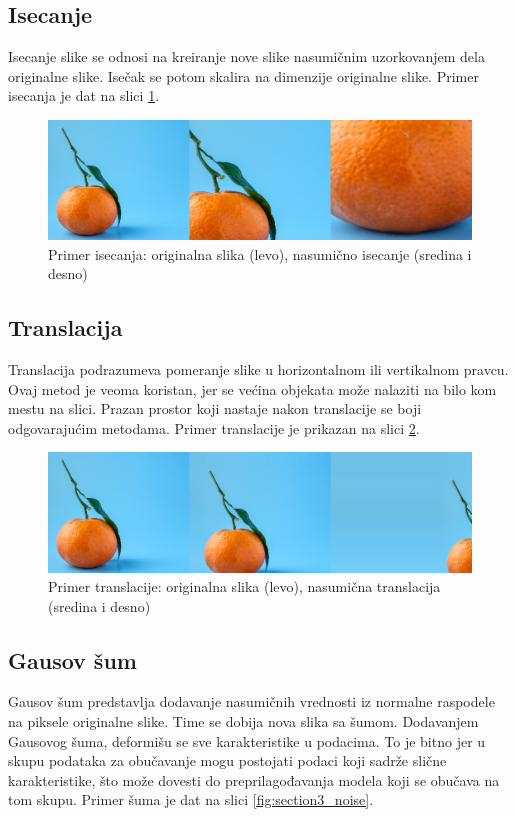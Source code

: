 \documentclass[12pt,oneside]{memoir}
\begin{document}
\subsection{Isecanje}
Isecanje slike se odnosi na kreiranje nove slike nasumičnim uzorkovanjem dela originalne slike. Isečak se potom skalira na dimenzije originalne slike. Primer isecanja je dat na slici \ref{fig:section3_cut}.
 
\begin{figure}[ht]
    \centering
    \includegraphics[width=1\textwidth]{matfmaster/glava3/crop.jpg}
    \caption{Primer isecanja: originalna slika (levo), nasumično isecanje (sredina i desno) \cite{unsplashOrange}}
    \label{fig:section3_cut}
\end{figure}

\subsection{Translacija}
Translacija podrazumeva pomeranje slike u horizontalnom ili vertikalnom pravcu. Ovaj metod je veoma koristan, jer se većina objekata može nalaziti na bilo kom mestu na slici. Prazan prostor koji nastaje nakon translacije se boji odgovarajućim metodama. Primer translacije je prikazan na slici \ref{fig:section3_trans}.

\begin{figure}[ht]
    \centering
    \includegraphics[width=1\textwidth]{matfmaster/glava3/translate.jpg}
    \caption{Primer translacije: originalna slika (levo), nasumična translacija (sredina i desno) \cite{unsplashOrange}}
    \label{fig:section3_trans}
\end{figure}

\subsection{Gausov šum}
Gausov šum predstavlja dodavanje nasumičnih vrednosti iz normalne raspodele na piksele originalne slike. Time se dobija nova slika sa šumom. Dodavanjem Gausovog šuma, deformišu se sve karakteristike u podacima. To je bitno jer u skupu podataka za obučavanje mogu postojati podaci koji sadrže slične karakteristike, što može dovesti do preprilagođavanja modela koji se obučava na tom skupu. Primer šuma je dat na slici \ref{fig:section3_noise}.
\end{document}
